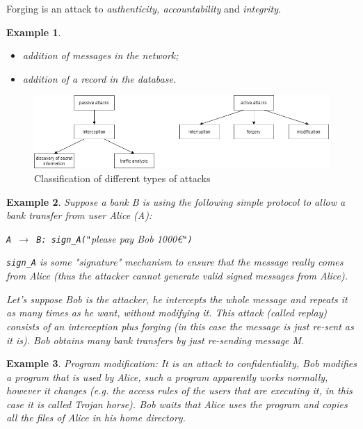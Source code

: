 \documentclass[a4paper, 12pt]{report}
\newtheorem{example}{\textbf{Example}}
\begin{document}
Forging is an attack to \textit{authenticity, accountability} and \textit{integrity}.

\begin{example}
	\leavevmode
	\begin{itemize}
		\item addition of messages in the network;
		\item addition of a record in the database.
	\end{itemize}
\end{example}

\vspace{35mm}

\begin{figure}[H]
	\centering
	\includegraphics[scale=0.55]{images/typeofattacks.png}
	\caption{Classification of different types of attacks}
	\label{fig:typeofattacks}
\end{figure}
\newpage
\begin{example}
	Suppose a bank B is using the following simple protocol to allow a bank transfer from user Alice (A):\\
	\begin{center}
	\texttt{A $\rightarrow$ B: sign\_A("}please pay Bob 1000€\texttt{")}
	\end{center}
	\texttt{sign\_A} is some "signature" mechanism to ensure that the message really comes from Alice (thus the attacker cannot generate valid signed messages from Alice).
	
	Let's suppose Bob is the attacker, he intercepts the whole message and repeats it as many times as he want, without modifying it. This attack (called replay) consists of an interception plus forging (in this case the message is just re-sent as it is). Bob obtains many bank transfers by just re-sending message M.
\end{example}

\begin{example}
	Program modification: It is an attack to confidentiality, Bob modifies a program that is used by Alice, such a program apparently works normally, however it changes (e.g. the access rules of the users that are executing it, in this case it is called \textit{Trojan horse}). Bob waits that Alice uses the program and copies all the files of Alice in his home directory.
\end{example}
\end{document}
